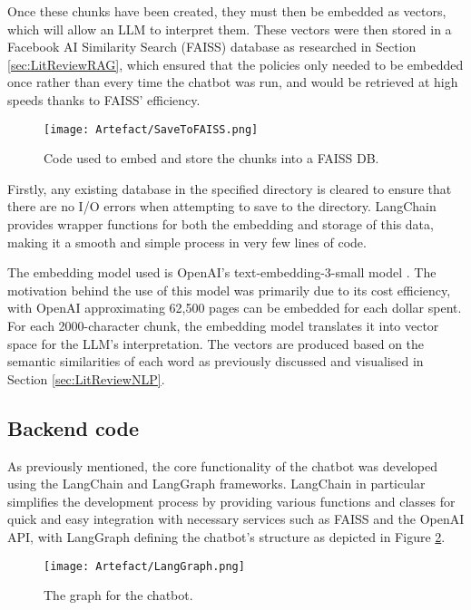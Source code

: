 \para Once these chunks have been created, they must then be embedded as vectors, which will allow an LLM to interpret them. These 
vectors were then stored in a Facebook AI Similarity Search (FAISS) database as researched in Section \ref{sec:LitReviewRAG}, which 
ensured that the policies only needed to be embedded once rather than every time the chatbot was run, and would be retrieved 
at high speeds thanks to FAISS' efficiency.

\begin{figure}[H]
    \centering
    \texttt{[image: Artefact/SaveToFAISS.png]}
    \caption{Code used to embed and store the chunks into a FAISS DB. \label{fig:LangChainStoreFAISS}}
\end{figure}

\noindent Firstly, any existing database in the specified directory is cleared to ensure that there are no I/O errors when attempting 
to save to the directory. LangChain provides wrapper functions for both the embedding and storage of this data, making it a smooth 
and simple process in very few lines of code. 

\para The embedding model used is OpenAI's text-embedding-3-small model \autocite{openai_vector_nodate}. The motivation behind the use of this model 
was primarily due to its cost efficiency, with OpenAI approximating 62,500 pages can be embedded for each dollar spent. For each 
2000-character chunk, the embedding model translates it into vector space for the LLM's interpretation. The vectors are produced based on the 
semantic similarities of each word as previously discussed and visualised in Section \ref{sec:LitReviewNLP}. 




\subsection{Backend code}\label{sec:ChatbotBackend}
As previously mentioned, the core functionality of the chatbot was developed using the LangChain and LangGraph frameworks. LangChain in particular
simplifies the development process by providing various functions and classes for quick and easy integration with necessary services such 
as FAISS and the OpenAI API, with LangGraph defining the chatbot's structure as depicted in Figure \ref{fig:ChatbotLangGraph}. 

\begin{figure}[H]
    \centering
    \texttt{[image: Artefact/LangGraph.png]}
    \caption{The graph for the chatbot. \label{fig:ChatbotLangGraph}}
\end{figure}



